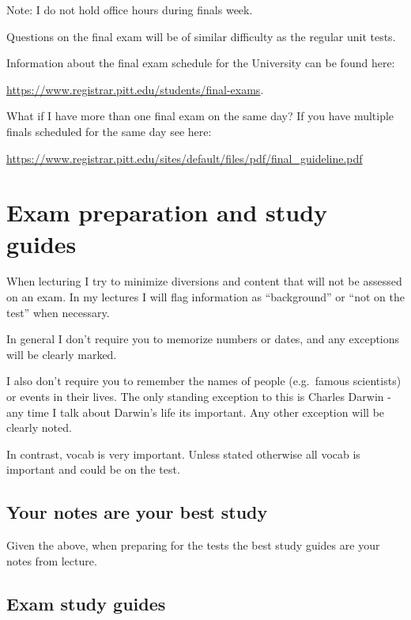 \documentclass[
]{book}
\begin{document}
Note: I do not hold office hours during finals week.

Questions on the final exam will be of similar difficulty as the regular unit tests.

Information about the final exam schedule for the University can be found here:

\url{https://www.registrar.pitt.edu/students/final-exams}.

What if I have more than one final exam on the same day?
If you have multiple finals scheduled for the same day see here:

\url{https://www.registrar.pitt.edu/sites/default/files/pdf/final_guideline.pdf}

\hypertarget{exam-preparation-and-study-guides}{%
\chapter{Exam preparation and study guides}\label{exam-preparation-and-study-guides}}

When lecturing I try to minimize diversions and content that will not be assessed on an exam. In my lectures I will flag information as ``background'' or ``not on the test'' when necessary.

In general I don't require you to memorize numbers or dates, and any exceptions will be clearly marked.

I also don't require you to remember the names of people (e.g.~famous scientists) or events in their lives. The only standing exception to this is Charles Darwin - any time I talk about Darwin's life its important. Any other exception will be clearly noted.

In contrast, vocab is very important. Unless stated otherwise all vocab is important and could be on the test.

\hypertarget{your-notes-are-your-best-study}{%
\section{Your notes are your best study}\label{your-notes-are-your-best-study}}

Given the above, when preparing for the tests the best study guides are your notes from lecture.

\hypertarget{exam-study-guides}{%
\section{Exam study guides}\label{exam-study-guides}}
\end{document}
